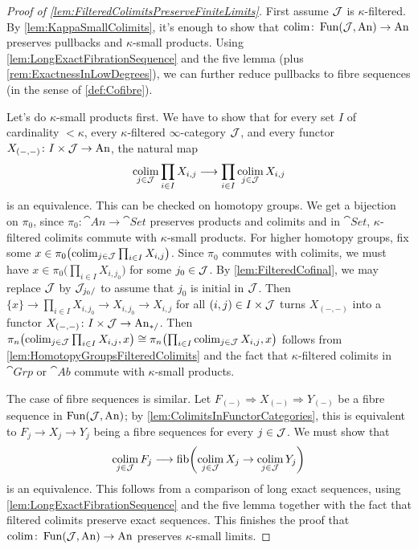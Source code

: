 \begin{proof}[Proof of \cref{lem:FilteredColimitsPreserveFiniteLimits}]
	First assume $\mathcal{J}$ is $\kappa$-filtered. By \cref{lem:KappaSmallColimits}, it's enough to show that $\operatorname*{colim}\colon\operatorname{Fun}(\mathcal{J},\mathrm{An})\rightarrow\mathrm{An}$ preserves pullbacks and $\kappa$-small products. Using \cref{lem:LongExactFibrationSequence} and the five lemma (plus \cref{rem:ExactnessInLowDegrees}), we can further reduce pullbacks to fibre sequences (in the sense of \cref{def:Cofibre}).
	
	Let's do $\kappa$-small products first. We have to show that for every set $I$ of cardinality $<\kappa$, every $\kappa$-filtered $\infty$-category $\mathcal{J}$, and every functor $X_{(-,-)}\colon I\times\mathcal{J}\rightarrow\mathrm{An}$, the natural map
	\begin{equation*}
		\operatorname*{colim}_{j\in\mathcal{J}}\prod_{i\in I}X_{i,j}\longrightarrow\prod_{i\in I}\operatorname*{colim}_{j\in\mathcal{J}}X_{i,j}
	\end{equation*}
	is an equivalence. This can be checked on homotopy groups. We get a bijection on $\pi_0$, since $\pi_0\colon\cat{An}\rightarrow\cat{Set}$ preserves products and colimits and in $\cat{Set}$, $\kappa$-filtered colimits commute with $\kappa$-small products. For higher homotopy groups, fix some $x\in \pi_0\bigl(\operatorname*{colim}_{j\in\mathcal{J}}\prod_{i\in I}X_{i,j}\bigr)$. Since $\pi_0$ commutes with colimits, we must have $x\in \pi_0\bigl(\prod_{i\in I}X_{i,j_0}\bigr)$ for some $j_0\in \mathcal{J}$. By \cref{lem:FilteredCofinal}, we may replace $\mathcal{J}$ by $\mathcal{J}_{j_0/}$ to assume that $j_0$ is initial in $\mathcal{J}$. Then $\{x\}\rightarrow \prod_{i\in I}X_{i,j_0}\rightarrow X_{i,j_0}\rightarrow X_{i,j}$ for all $(i,j)\in I\times\mathcal{J}$ turns $X_{(-,-)}$ into a functor $X_{(-,-)}\colon I\times\mathcal{J}\rightarrow\mathrm{An}_{*/}$. Then $\pi_n\bigl(\operatorname*{colim}_{j\in\mathcal{J}}\prod_{i\in I}X_{i,j},x\bigr)\cong\pi_n\bigl(\prod_{i\in I}\operatorname*{colim}_{j\in\mathcal{J}}X_{i,j},x\bigr)$ follows from \cref{lem:HomotopyGroupsFilteredColimits} and the fact that $\kappa$-filtered colimits in $\cat{Grp}$ or $\cat{Ab}$ commute with $\kappa$-small products.%
	
	The case of fibre sequences is similar. Let $F_{(-)}\Rightarrow X_{(-)}\Rightarrow Y_{(-)}$ be a fibre sequence in $\operatorname{Fun}(\mathcal{J},\mathrm{An})$; by \cref{lem:ColimitsInFunctorCategories}, this is equivalent to $F_j\rightarrow X_j\rightarrow Y_j$ being a fibre sequences for every $j\in\mathcal{J}$. We must show that
	\begin{equation*}
		\operatorname*{colim}_{j\in \mathcal{J}}F_j\longrightarrow\operatorname{fib}\!\left(\operatorname*{colim}_{j\in\mathcal{J}}X_j\rightarrow \operatorname*{colim}_{j\in\mathcal{J}}Y_j\right)
	\end{equation*}
	is an equivalence. This follows from a comparison of long exact sequences, using \cref{lem:LongExactFibrationSequence} and the five lemma together with the fact that filtered colimits preserve exact sequences. This finishes the proof that $\operatorname*{colim}\colon \operatorname{Fun}(\mathcal{J},\mathrm{An})\rightarrow\mathrm{An}$ preserves $\kappa$-small limits.
	

\end{proof}
